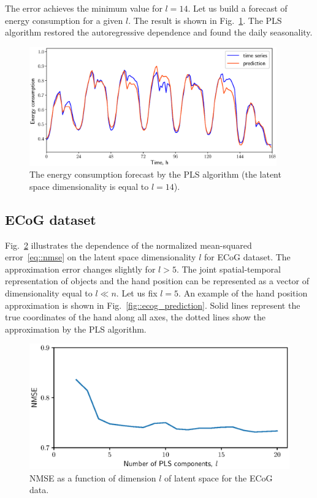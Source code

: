\documentclass[12pt,twoside]{article}
\begin{document}
The error achieves the minimum value for $l=14$. 
Let us build a forecast of energy consumption for a given $l$. 
The result is shown in Fig.~\ref{fig::energy_prediction}. 
The PLS algorithm restored the autoregressive dependence and found the daily seasonality.

\begin{figure}[!h]
	\centering
	\includegraphics[width=0.95\textwidth]{figs/energy_prediction}
	\caption{The energy consumption forecast by the PLS algorithm (the latent space dimensionality is equal to $l=14$).}
	\label{fig::energy_prediction}
\end{figure}

\subsection{ECoG dataset}
Fig.~\ref{fig::ecog_n_comp} illustrates the dependence of the normalized mean-squared error~\eqref{eq::nmse} on the latent space dimensionality $l$ for ECoG dataset. 
The approximation error changes slightly for $l > 5$.
The joint spatial-temporal representation of objects and the hand position can be represented as a vector of dimensionality equal to $l \ll n$.
Let us fix $l = 5$. 
An example of the hand position approximation is shown in Fig.~\ref{fig::ecog_prediction}. 
Solid lines represent the true coordinates of the hand along all axes, the dotted lines show the approximation by the PLS algorithm.
 
\begin{figure}[!h]
	\centering
	\includegraphics[width=0.75\linewidth]{figs/ecog_n_comp}	
	\caption{NMSE as a function of dimension $l$ of latent space for the ECoG data.}
	\label{fig::ecog_n_comp}
\end{figure}
\end{document}
